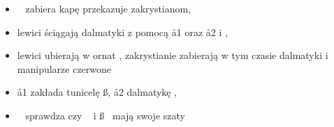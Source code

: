 \begin{itemize}
	      \begin{itemize}
		      \item \cc~ zabiera kapę przekazuje zakrystianom,
		      \item lewici ściągają dalmatyki z pomocą \aa1 oraz \aa2 i \cc,
		      \item lewici ubierają w ornat \ii, zakrystianie zabierają w tym
		            czasie dalmatyki i manipularze czerwone
		      \item \aa1 zakłada tunicelę \ss, \aa2 dalmatykę \dd,
		      \item \cc~ sprawdza czy \dd~ i \ss~ mają swoje szaty
	      \end{itemize}

\end{itemize}

\enlargethispage{20pt}

